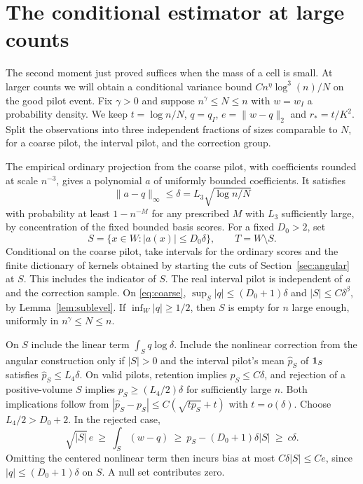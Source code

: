 \section{The conditional estimator at large counts}\label{sec:high}

The second moment just proved suffices when the mass of a cell
is small. At larger counts we will obtain a conditional variance
bound \(C n^\eta\log^3(n)/N\) on the good pilot event.
Fix \(\gamma>0\) and suppose
\(n^\gamma\le N\le n\) with \(w=w_I\) a probability density.
We keep \(t=\log n/N\), \(q=q_I\), \(e=\|w-q\|_2\) and
\(r_*=t/K^2\). Split the observations into three independent
fractions of sizes comparable to \(N\), for a coarse pilot,
the interval pilot, and the correction group.

The empirical ordinary projection from the coarse pilot,
with coefficients rounded at scale \(n^{-3}\), gives a
polynomial \(a\) of uniformly bounded coefficients. It satisfies
\begin{equation}\label{eq:coarse}
 \|a-q\|_\infty\le \delta=L_3\sqrt{\log n/N}
\end{equation}
with probability at least \(1-n^{-M}\) for any prescribed
\(M\) with \(L_3\) sufficiently large, by concentration
of the fixed bounded basis scores. For a fixed \(D_0>2\), set
\[
 S=\{x\in W: |a(x)|\le D_0\delta\},\qquad T=W\setminus S .
\]
Conditional on the coarse pilot, take intervals for the
ordinary scores and the finite dictionary of kernels obtained
by starting the cuts of Section~\ref{sec:angular} at \(S\).
This includes the indicator of \(S\).
The real interval pilot is independent of \(a\) and the
correction sample. On \eqref{eq:coarse},
\(\sup_S|q|\le(D_0+1)\delta\) and \(|S|\le C\delta^\beta\),
by Lemma~\ref{lem:sublevel}. If \(\inf_W|q|\ge1/2\),
then \(S\) is empty for \(n\) large enough, uniformly in
\(n^\gamma\le N\le n\).

On \(S\) include the linear term \(\int_S q\log\delta\).
Include the nonlinear correction from the angular construction
only if \(|S|>0\) and the interval pilot's mean
\(\widehat p_S\) of \(\mathbf 1_S\) satisfies
\(\widehat p_S\le L_4\delta\). On valid pilots, retention implies
\(p_S\le C\delta\), and rejection of a positive-volume \(S\)
implies \(p_S\ge (L_4/2)\delta\) for sufficiently large \(n\).
Both implications follow from
\(|\widehat p_S-p_S|\le C(\sqrt{tp_S}+t)\) with \(t=o(\delta)\).
Choose \(L_4/2>D_0+2\).
In the rejected case,
\[
 \sqrt{|S|}\,e\ \ge\ \int_S(w-q)
   \ \ge\ p_S-(D_0+1)\delta |S|\ \ge\ c\delta .
\]
Omitting the centered nonlinear term then incurs bias at
most \(C\delta|S|\le Ce\), since \(|q|\le(D_0+1)\delta\)
on \(S\). A null set contributes zero.

